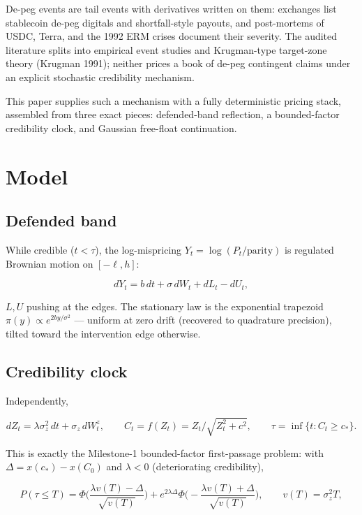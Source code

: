 \documentclass[
  english,
  10pt,
  letterpaper,
  DIV=11,
  numbers=noendperiod]{scrartcl}
\begin{document}
De-peg events are tail events with derivatives written on them:
exchanges list stablecoin de-peg digitals and shortfall-style payouts,
and post-mortems of USDC, Terra, and the 1992 ERM crises document their
severity. The audited literature splits into empirical event studies and
Krugman-type target-zone theory (Krugman 1991); neither prices a book of
de-peg contingent claims under an explicit stochastic credibility
mechanism.

This paper supplies such a mechanism with a fully deterministic pricing
stack, assembled from three exact pieces: defended-band reflection, a
bounded-factor credibility clock, and Gaussian free-float continuation.

\section{Model}\label{sec-model}

\subsection{Defended band}\label{defended-band}

While credible (\(t<\tau\)), the log-mispricing
\(Y_t=\log(P_t/\text{parity})\) is regulated Brownian motion on
\([-\ell,h]\):

\[
dY_t=b\,dt+\sigma\,dW_t+dL_t-dU_t ,
\]

\(L,U\) pushing at the edges. The stationary law is the exponential
trapezoid \(\pi(y)\propto e^{2by/\sigma^2}\) --- uniform at zero drift
(recovered to quadrature precision), tilted toward the intervention edge
otherwise.

\subsection{Credibility clock}\label{credibility-clock}

Independently,

\[
dZ_t=\lambda\sigma_z^2\,dt+\sigma_z\,dW^z_t,\qquad
C_t=f(Z_t)=Z_t/\sqrt{Z_t^2+c^2},\qquad
\tau=\inf\{t:C_t\ge c_*\}.
\]

This is exactly the Milestone-1 bounded-factor first-passage problem:
with \(\Delta=x(c_*)-x(C_0)\) and \(\lambda<0\) (deteriorating
credibility),

\[
P(\tau\le T)=\Phi\!\Big(\frac{\lambda v(T)-\Delta}{\sqrt{v(T)}}\Big)
+e^{2\lambda\Delta}\Phi\!\Big(-\frac{\lambda v(T)+\Delta}{\sqrt{v(T)}}\Big),
\qquad v(T)=\sigma_z^2T,
\]
\end{document}
